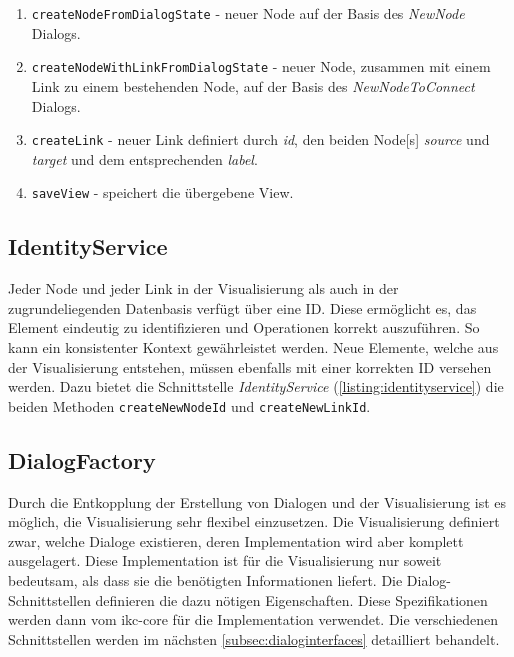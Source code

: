 \begin{enumerate}
  \item \texttt{createNodeFromDialogState} - neuer \gls{Node} auf der Basis des \textit{NewNode} Dialogs.
  \item \texttt{createNodeWithLinkFromDialogState} - neuer \gls{Node}, zusammen mit einem \gls{Link} zu einem bestehenden \gls{Node}, auf der Basis des \textit{NewNodeToConnect} Dialogs.
  \item \texttt{createLink} - neuer \gls{Link} definiert durch \textit{id}, den beiden \gls{Node}[s] \textit{source} und \textit{target} und dem entsprechenden \textit{label}.
  \item \texttt{saveView} - speichert die übergebene \gls{View}.
\end{enumerate}


\subsection{IdentityService}
\label{IdentityService}

Jeder \gls{Node} und jeder \gls{Link} in der Visualisierung als auch in der zugrundeliegenden Datenbasis verfügt über eine ID. Diese ermöglicht es, das Element eindeutig zu identifizieren und Operationen korrekt auszuführen. So kann ein konsistenter Kontext gewährleistet werden. Neue Elemente, welche aus der Visualisierung entstehen, müssen ebenfalls mit einer korrekten ID versehen werden. Dazu bietet die Schnittstelle \textit{IdentityService} (\autoref{listing:identityservice}) die beiden Methoden \texttt{create\-New\-Node\-Id} und \texttt{createNewLinkId}.


\subsection{DialogFactory}
\label{DialogFactory}
Durch die Entkopplung der Erstellung von Dialogen und der Visualisierung ist es möglich, die Visualisierung sehr flexibel einzusetzen. Die Visualisierung definiert zwar, welche Dialoge existieren, deren Implementation wird aber komplett ausgelagert. Diese Implementation ist für die Visualisierung nur soweit bedeutsam, als dass sie die benötigten Informationen liefert. Die Dialog-Schnittstellen definieren die dazu nötigen Eigenschaften. Diese Spezifikationen werden dann vom \gls{ikc-core} für die Implementation verwendet. Die verschiedenen Schnittstellen werden im nächsten \autoref{subsec:dialoginterfaces} detailliert behandelt.

